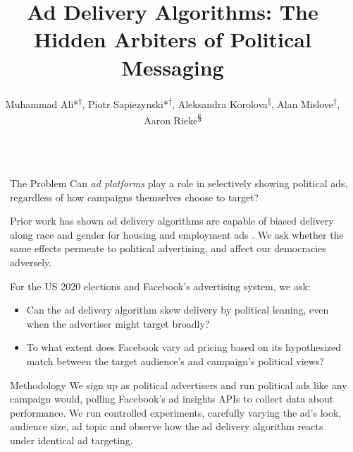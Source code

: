 \documentclass[final,hyperref={pdfpagelabels=false}]{beamer}
\title{\Huge Ad Delivery Algorithms: The Hidden Arbiters of Political Messaging} %
\author{Muhammad Ali*\textsuperscript{†}, Piotr Sapiezynski*\textsuperscript{†}, Aleksandra Korolova\textsuperscript{‖}, Alan Mislove\textsuperscript{†}, Aaron Rieke\textsuperscript{\S}}
\institute{\textsuperscript{†}Northeastern University; \textsuperscript{‖}University of Southern California; \textsuperscript{\S}Upturn
  \\\vspace{4mm}\footnotesize{*equal contribution}
  }
\newcommand{\shrink}{-15pt}
\begin{document}

\begin{frame}[t] %

  \begin{columns}[t] %

    \begin{column}{.02\textwidth}\end{column} %


    \begin{column}{.45\textwidth} %

      \vspace{\shrink}
      \begin{block}{\Large The Problem}
        Can {\it ad platforms} play a role in selectively showing political ads, regardless of how campaigns themselves choose to target? \vspace{1em}
        
        Prior work has shown ad delivery algorithms are capable of biased delivery along race and gender for housing and employment ads \cite{ali-2019-cscw}.
        We ask whether the same effects permeate to political advertising, and affect our democracies adversely. \vspace{1em}

        For the US 2020 elections and Facebook's advertising system, we ask:
        \begin{itemize}
          \item Can the ad delivery algorithm skew delivery by political leaning, even when the advertiser might target broadly?
          \item To what extent does Facebook vary ad pricing based on its hypothesized match between the target audience’s and campaign’s political views?
        \end{itemize}        
      \end{block}

      \begin{block}{\Large Methodology}
        We sign up as political advertisers and run political ads like any campaign would, polling Facebook's ad insights APIs to collect data about performance.
        We run controlled experiments, carefully varying the ad's look, audience size, ad topic and observe how the ad delivery algorithm reacts under identical ad targeting.\vspace{.5em}


\end{block}
\end{column}
\end{columns}
\end{frame}
\end{document}
